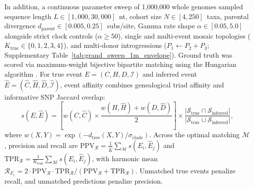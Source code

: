In addition, a continuous parameter sweep of 1,000,000 whole genomes sampled sequence length $L \in [1{,}000, 30{,}000]$~nt, cohort size $N \in [4, 250]$~taxa, parental divergence $d_{\mathrm{parent}} \in [0.005, 0.25]$~subs/site, Gamma rate shape $\alpha \in [0.05, 5.0]$ alongside strict clock controls ($\alpha \ge 50$), single and multi-event mosaic topologies ($K_{\mathrm{true}} \in \{0, 1, 2, 3, 4\}$), and multi-donor introgressions ($P_1 \leftarrow P_2 + P_3$; Supplementary Table~\ref{tab:grand_sweep_1m_envelope}). Ground truth was scored via maximum-weight bijective bipartite matching using the Hungarian algorithm \citep{kuhn1955hungarian}. For true event $E = (C, H, D, \mathcal{I})$ and inferred event $\hat{E} = (\hat{C}, \hat{H}, \hat{D}, \hat{\mathcal{I}})$, event affinity combines genealogical triad affinity and informative SNP Jaccard overlap:
\begin{equation}
s(E, \hat{E}) = \left[ w(C, \hat{C}) \times \frac{w(H, \hat{H}) + w(D, \hat{D})}{2} \right] \times \frac{|\mathcal{S}_{\text{true}} \cap \mathcal{S}_{\text{inferred}}|}{|\mathcal{S}_{\text{true}} \cup \mathcal{S}_{\text{inferred}}|},
\label{eq:methods_event_affinity}
\end{equation}
where $w(X, Y) = \exp(-d_{\text{tree}}(X, Y) / \sigma_{\text{clade}})$. Across the optimal matching $\mathcal{M}$, precision and recall are $\text{PPV}_{\mathcal{R}} = \frac{1}{\hat{K}} \sum_{\mathcal{M}} s(E_i, \hat{E}_j)$ and $\text{TPR}_{\mathcal{R}} = \frac{1}{K_{\mathrm{true}}} \sum_{\mathcal{M}} s(E_i, \hat{E}_j)$, with harmonic mean $\mathcal{R}_{F_1} = 2 \cdot \text{PPV}_{\mathcal{R}} \cdot \text{TPR}_{\mathcal{R}} / (\text{PPV}_{\mathcal{R}} + \text{TPR}_{\mathcal{R}})$. Unmatched true events penalize recall, and unmatched predictions penalize precision.

